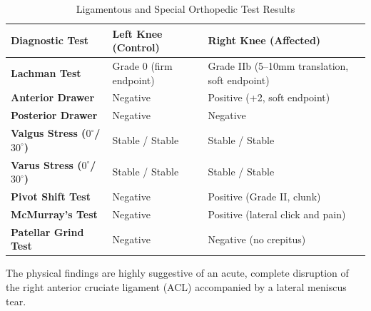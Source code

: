 \begin{table}[h]
\centering
\caption{Ligamentous and Special Orthopedic Test Results}
\label{tab:special_tests}
\begin{tabularx}{\textwidth}{lXX}
  \toprule
  \textbf{Diagnostic Test} & \textbf{Left Knee (Control)} & \textbf{Right Knee (Affected)} \\
  \midrule
  \textbf{Lachman Test} & Grade 0 (firm endpoint) & Grade IIb (5--10mm translation, soft endpoint) \\
  \textbf{Anterior Drawer} & Negative & Positive (+2, soft endpoint) \\
  \textbf{Posterior Drawer} & Negative & Negative \\
  \textbf{Valgus Stress ($0^\circ$/$30^\circ$)} & Stable / Stable & Stable / Stable \\
  \textbf{Varus Stress ($0^\circ$/$30^\circ$)} & Stable / Stable & Stable / Stable \\
  \textbf{Pivot Shift Test} & Negative & Positive (Grade II, clunk) \\
  \textbf{McMurray's Test} & Negative & Positive (lateral click and pain) \\
  \textbf{Patellar Grind Test} & Negative & Negative (no crepitus) \\
  \bottomrule
\end{tabularx}
\end{table}

The physical findings are highly suggestive of an acute, complete disruption of the right anterior cruciate ligament (ACL) accompanied by a lateral meniscus tear.
